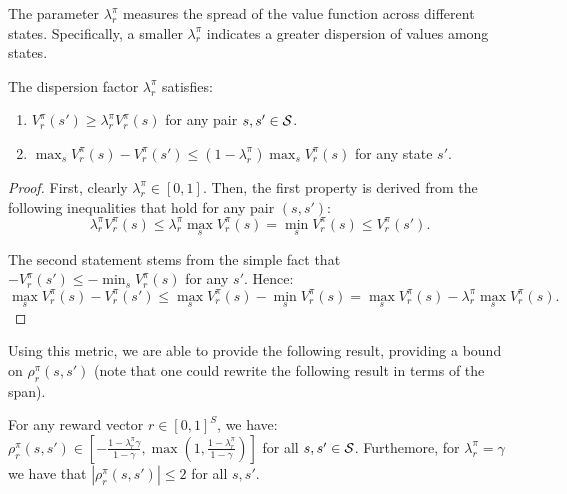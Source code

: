 The parameter $\lambda_r^\pi$ measures the spread of the value function across different states. Specifically, a smaller $\lambda_r^\pi$ indicates a greater dispersion of values among states.



\begin{tcolorbox}
\begin{lemma}
    The dispersion factor $\lambda_r^\pi$ satisfies:
    \begin{enumerate}
        \item $V_r^\pi(s')\geq \lambda_r^\pi V_r^\pi(s)$ for any pair $s,s'\in {\cal S}$.
        \item $\max_s V_r^\pi(s)- V_r^\pi(s')\leq (1-\lambda_r^\pi) \max_s V_r^\pi(s)$ for any state $s'$.
    \end{enumerate}
\end{lemma}
\end{tcolorbox}
\begin{proof}
First, clearly $\lambda_r^\pi \in [0,1]$. Then, the first property is derived from the following inequalities that hold for any pair $(s,s')$:
    \[
    \lambda_r^\pi V_r^\pi(s)\leq \lambda_r^\pi \max_s V_r^\pi(s)= \min_{s} V_r^\pi(s) \leq  V_r^\pi(s').
    \]

    The second statement stems from the simple fact that  $-V_r^\pi(s') \leq -\min_s V_r^\pi(s)$ for any $s'$. Hence:
    \[
     \max_s V_r^\pi(s)-V_r^\pi(s') \leq \max_s V_r^\pi(s)- \min_{s} V_r^\pi(s)  = \max_s V_r^\pi(s)- \lambda_r^\pi\max_{s} V_r^\pi(s).
    \]
\end{proof}
Using this metric, we are able to provide the following result, providing a bound on $\rho_r^\pi(s,s')$ (note that one could  rewrite the following result in terms of the span).
\begin{tcolorbox}
    
\begin{lemma}
    For any reward vector $r \in [0,1]^S$, we have:$\rho_r^\pi(s,s') \in \left[-\frac{1-\lambda_r^\pi \gamma}{1-\gamma}, \max\left(1, \frac{1 -\lambda_r^\pi}{1-\gamma} \right)\right]$ for all $s,s' \in {\cal S}$.
    Furthemore, for $\lambda_r^\pi=\gamma$ we have that $|\rho_r^\pi(s,s')|\leq 2$ for all $s,s'$.
\end{lemma}
\end{tcolorbox}
